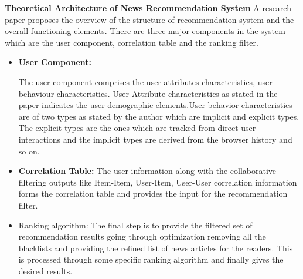 \textbf{Theoretical Architecture of News Recommendation System}\newline
 A research paper proposes the overview of the structure of recommendation system and the overall functioning elements.\newline
 There are three major components in the system which are the user component, correlation table and the ranking filter. \newline
 \begin{itemize}
     \item \textbf{User Component: }

 The user component comprises the user attributes characteristics, user behaviour characteristics. User Attribute characteristics as stated in the paper indicates the user demographic elements.User behavior characteristics are of two types as stated by the author which are implicit and explicit types. The explicit types are the ones which are tracked from direct user interactions and the implicit types are derived from the browser history and so on\cite{Li2019}.  
 
  \item \textbf{ Correlation Table: }
  The user information along with the collaborative filtering outputs like Item-Item, User-Item,  User-User correlation information forms the correlation table and provides the input for the recommendation filter.
  
  \item{Ranking algorithm: }
  The final step is to provide the filtered set of recommendation results going through optimization removing all the blacklists and providing the refined list of news articles for the readers. This is processed through some specific ranking algorithm and finally gives the desired results.
 
  \end{itemize}
  
